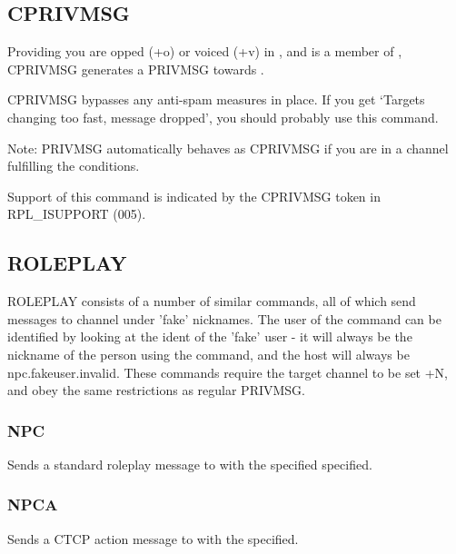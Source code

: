 \subsection{CPRIVMSG}

	  \literal{:}

	Providing you are opped (+o) or voiced (+v) in ,
	and  is a member of , CPRIVMSG
	generates a PRIVMSG towards .

	CPRIVMSG bypasses any anti-{}spam measures in place. If you get
	`Targets changing too fast, message dropped', you should probably use
	this command.

	Note: PRIVMSG automatically behaves as CPRIVMSG	if you are in a channel
	fulfilling the conditions.

	Support of this command is indicated by the CPRIVMSG token in
	RPL\_ISUPPORT (005).

\subsection{ROLEPLAY}
	ROLEPLAY consists of a number of similar commands, all of which send
	messages to channel under 'fake' nicknames. The user of the command can
	be identified by looking at the ident of the 'fake' user - it will
	always be the nickname of the person using the command, and the host
	will always be npc.fakeuser.invalid. These commands require the target
	channel to be set +N, and obey the same restrictions as regular
	PRIVMSG.


\subsubsection{NPC}
	  \literal{:} 

	Sends a standard roleplay message to  with the
	 specified specified.

\subsubsection{NPCA}
	  \literal{:} 

	Sends a CTCP action message to  with the 
	 specified.

